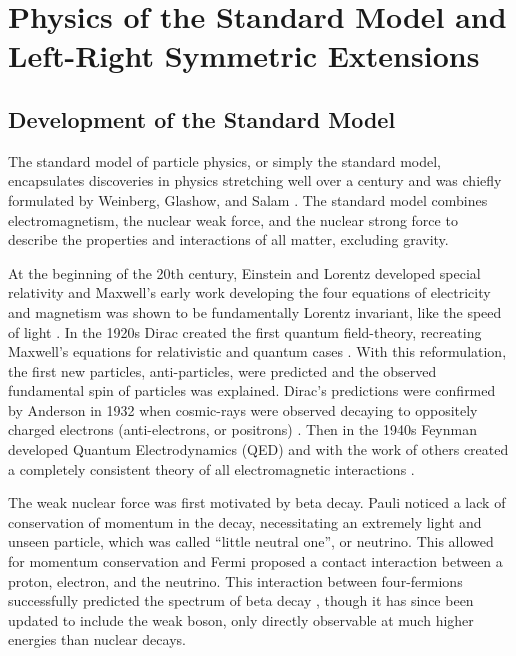 \chapter{Physics of the Standard Model and Left-Right Symmetric Extensions}
\label{ch:theory}

\section{Development of the Standard Model}

The standard model of particle physics, or simply the standard model, encapsulates discoveries in physics stretching well over a century and was chiefly formulated by Weinberg, Glashow, and Salam \cite{PhysRevLett.19.1264}\cite{nla.cat-vn956113}.  The standard model combines electromagnetism, the nuclear weak force, and the nuclear strong force to describe the properties and interactions of all matter, excluding gravity.

At the beginning of the 20th century, Einstein and Lorentz developed special relativity and Maxwell's early work developing the four equations of electricity and magnetism was shown to be fundamentally Lorentz invariant, like the speed of light \cite{1898KNAB1427L}\cite{doi:10.1002/andp.19053221004}.  In the 1920s Dirac created the first quantum field-theory, recreating Maxwell's equations for relativistic and quantum cases \cite{doi:10.1098/rspa.1928.0023}.  With this reformulation, the first new particles, anti-particles, were predicted and the observed fundamental spin of particles was explained.  Dirac's predictions were confirmed by Anderson in 1932 when cosmic-rays were observed decaying to oppositely charged electrons (anti-electrons, or positrons) \cite{PhysRev.43.491}.  Then in the 1940s Feynman developed Quantum Electrodynamics (QED) and with the work of others created a completely consistent theory of all electromagnetic interactions \cite{PhysRev.76.769}.

The weak nuclear force was first motivated by beta decay.  Pauli noticed a lack of conservation of momentum in the decay, necessitating an extremely light and unseen particle, which was called ``little neutral one'', or neutrino.  This allowed for momentum conservation and Fermi proposed a contact interaction between a proton, electron, and the neutrino.  This interaction between four-fermions successfully predicted the spectrum of beta decay \cite{Fermi1934}, though it has since been updated to include the weak boson, only directly observable at much higher energies than nuclear decays.

